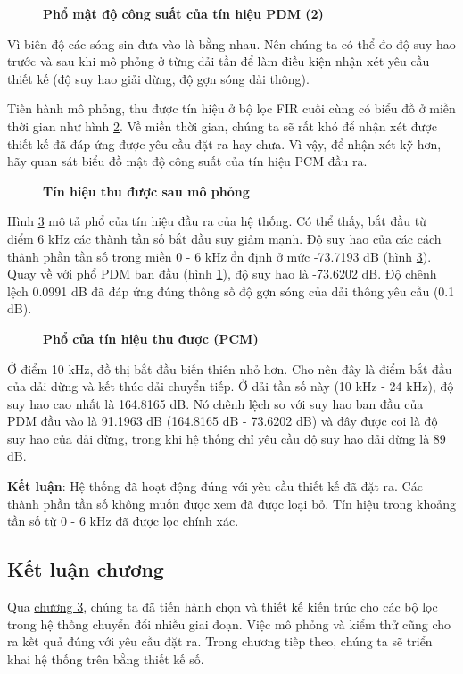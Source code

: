 \begin{figure}[H]
    \centering
    
    \caption[Phổ mật độ công suất của tín hiệu PDM (2)]{\bfseries \fontsize{12pt}{0pt}\selectfont Phổ mật độ công suất của tín hiệu PDM (2)}
    \label{sd3}
\end{figure}

Vì biên độ các sóng sin đưa vào là bằng nhau. Nên chúng ta có thể đo độ suy hao trước và sau khi mô phỏng ở từng dải tần để làm điều kiện nhận xét yêu cầu thiết kế (độ suy hao giải dừng, độ gợn sóng dải thông).

Tiến hành mô phỏng, thu được tín hiệu ở bộ lọc FIR cuối cùng có biểu đồ ở miền thời gian như hình \ref{pcm_o}. Về miền thời gian, chúng ta sẽ rất khó để nhận xét được thiết kế đã đáp ứng được yêu cầu đặt ra hay chưa. Vì vậy, để nhận xét kỹ hơn, hãy quan sát biểu đồ mật độ công suất của tín hiệu PCM đầu ra.
\begin{figure}[H]
    \centering
    
    \caption[Tín hiệu thu được sau mô phỏng]{\bfseries \fontsize{12pt}{0pt}\selectfont Tín hiệu thu được sau mô phỏng}
    \label{pcm_o}
\end{figure}

Hình \ref{psd_pcm} mô tả phổ của tín hiệu đầu ra của hệ thống. Có thể thấy, bắt đầu từ điểm 6 kHz các thành tần số bắt đầu suy giảm mạnh. Độ suy hao của các cách thành phần tần số trong miền 0 - 6 kHz ổn định ở mức -73.7193 dB (hình \ref{psd_pcm}). Quay về với phổ PDM ban đầu (hình \ref{sd3}), độ suy hao là -73.6202 dB. Độ chênh lệch 0.0991 dB đã đáp ứng đúng thông số độ gợn sóng của dải thông yêu cầu (0.1 dB). 
\begin{figure}[H]
    \centering
    
    \caption[Phổ của tín hiệu thu được (PCM)]{\bfseries \fontsize{12pt}{0pt}\selectfont Phổ của tín hiệu thu được (PCM)}
    \label{psd_pcm}
\end{figure}

Ở điểm 10 kHz, đồ thị bắt đầu biến thiên nhỏ hơn. Cho nên đây là điểm bắt đầu của dải dừng và kết thúc dải chuyển tiếp. Ở dải tần số này (10 kHz - 24 kHz), độ suy hao cao nhất là 164.8165 dB. Nó chênh lệch so với suy hao ban đầu của PDM đầu vào là 91.1963 dB (164.8165 dB - 73.6202 dB) và đây được coi là độ suy hao của dải dừng, trong khi hệ thống chỉ yêu cầu độ suy hao dải dừng là 89 dB.

\textbf{Kết luận}: Hệ thống đã hoạt động đúng với yêu cầu thiết kế đã đặt ra. Các thành phần tần số không muốn được xem đã được loại bỏ. Tín hiệu trong khoảng tần số từ 0 - 6 kHz đã được lọc chính xác.


\subsection{Kết luận chương}

Qua \hyperref[chuong3]{chương 3}, chúng ta đã tiến hành chọn và thiết kế kiến trúc cho các bộ lọc trong hệ thống chuyển đổi nhiều giai đoạn. Việc mô phỏng và kiểm thử cũng cho ra kết quả đúng với yêu cầu đặt ra. Trong chương tiếp theo, chúng ta sẽ triển khai hệ thống trên bằng thiết kế số.
\newpage
